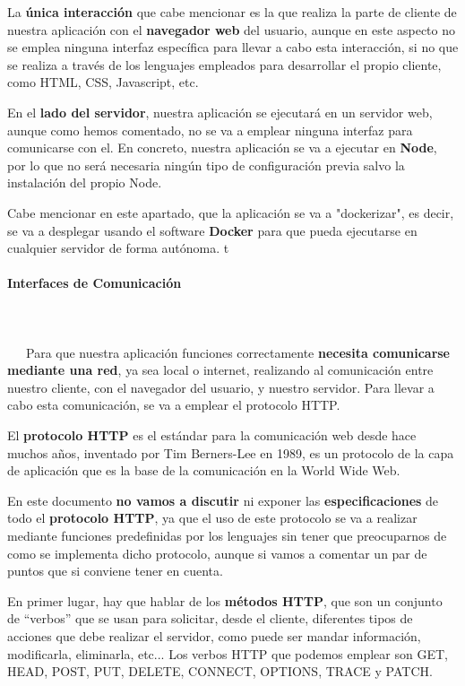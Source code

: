 La \textbf{única interacción} que cabe mencionar es la que realiza la parte de cliente de nuestra aplicación con el \textbf{navegador web} del usuario, aunque en este aspecto no se emplea ninguna interfaz específica para llevar a cabo esta interacción, si no que se realiza a través de los lenguajes empleados para desarrollar el propio cliente, como HTML, CSS, Javascript, etc.

En el \textbf{lado del servidor}, nuestra aplicación se ejecutará en un servidor web, aunque como hemos comentado, no se va a emplear ninguna interfaz para comunicarse con el. En concreto, nuestra aplicación se va a ejecutar en \textbf{Node}, por lo que no será necesaria ningún tipo de configuración previa salvo la instalación del propio Node.

Cabe mencionar en este apartado, que la aplicación se va a "dockerizar", es decir, se va a desplegar usando el software \textbf{Docker} para que pueda ejecutarse en cualquier servidor de forma autónoma.
t
\paragraph{Interfaces de Comunicación}
~\\\\
\-\ \-\ \-\ Para que nuestra aplicación funciones correctamente \textbf{necesita comunicarse mediante una red}, ya sea local o internet, realizando al comunicación entre nuestro cliente, con el navegador del usuario, y nuestro servidor. Para llevar a cabo esta comunicación, se va a emplear el protocolo \gls{HTTP}.

El \textbf{protocolo HTTP} es el estándar para la comunicación web desde hace muchos años, inventado por Tim Berners-Lee en 1989, es un protocolo de la capa de aplicación que es la base de la comunicación en la World Wide Web. \cite{wiki01}

En este documento \textbf{no vamos a discutir} ni exponer las \textbf{especificaciones} de todo el \textbf{protocolo HTTP}, ya que el uso de este protocolo se va a realizar mediante funciones predefinidas por los lenguajes sin tener que preocuparnos de como se implementa dicho protocolo, aunque si vamos a comentar un par de puntos que si conviene tener en cuenta.

En primer lugar, hay que hablar de los \textbf{métodos HTTP}, que son un conjunto de ``verbos'' que se usan para solicitar, desde el cliente, diferentes tipos de acciones que debe realizar el servidor, como puede ser mandar información, modificarla, eliminarla, etc... Los verbos HTTP que podemos emplear son GET, HEAD, POST, PUT, DELETE, CONNECT, OPTIONS, TRACE y PATCH. \cite{mdn01}

